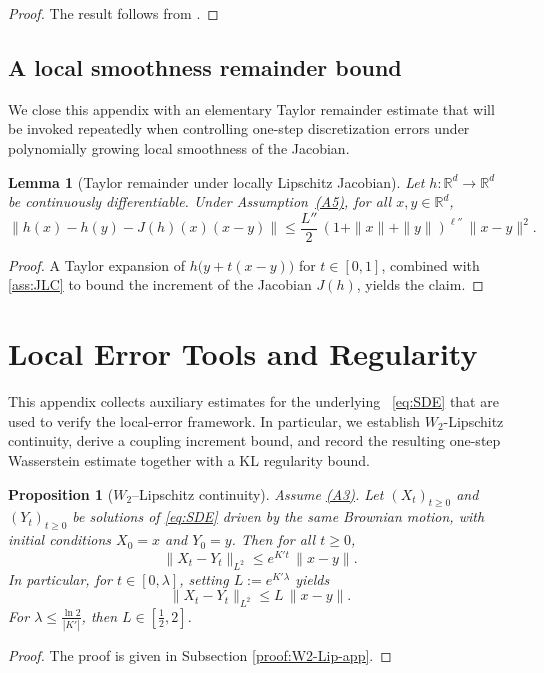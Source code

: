 \documentclass[11pt,a4paper,reqno]{amsart}
\theoremstyle{plain}
\newtheorem{lemma}{Lemma}
\newtheorem{proposition}{Proposition}
\theoremstyle{definition}
\theoremstyle{remark}
\newcommand{\R}{\mathbb{R}}
\begin{document}
\begin{proof}
The result follows from \cite[Lemma 4.2]{lytras2025ktula}.
\end{proof}


\subsection{A local smoothness remainder bound}

We close this appendix with an elementary Taylor remainder estimate that will be invoked
repeatedly when controlling one-step discretization errors under polynomially growing local
smoothness of the Jacobian.

\begin{lemma}[Taylor remainder under locally Lipschitz Jacobian]
\label{lem:local-jacobian}
Let $h:\R^d\to\R^d$ be continuously differentiable.
Under Assumption~\hyperref[ass:JLC]{\textup{(A5)}}, for all $x,y\in\R^d$,
\[
 \big\|h(x)-h(y)-J(h)(x)(x-y)\big\|
 \le \frac{L''}{2}\,(1+\|x\|+\|y\|)^{\ell''}\,\|x-y\|^{2}.
\]
\end{lemma}

\begin{proof}
A Taylor expansion of $h\bigl(y+t(x-y)\bigr)$ for $t\in[0,1]$, combined with \ref{ass:JLC} to bound the increment of the Jacobian $J(h)$, yields the claim.
\end{proof}



\section{Local Error Tools and Regularity}
\label{app:local-error}
This appendix collects auxiliary estimates for the underlying ~\eqref{eq:SDE} that are
used to verify the local-error framework. In particular, we establish
$W_2$-Lipschitz continuity, derive a coupling increment bound, and record the
resulting one-step Wasserstein estimate together with a KL regularity bound.

\begin{proposition}[$W_2$--Lipschitz continuity]
\label{prop:W2-Lip-app}
Assume \hyperref[ass:OSL]{\textup{(A3)}}. Let \((X_t)_{t\ge0}\) and \((Y_t)_{t\ge0}\) be
solutions of \eqref{eq:SDE} driven by the same Brownian motion, with initial conditions
\(X_0=x\) and \(Y_0=y\).
Then for all \(t\ge0\),
\[
  \|X_t-Y_t\|_{L^2}\le e^{K' t}\,\|x-y\|.
\]
In particular, for \(t\in[0,\lambda]\), setting \(L := e^{K'\lambda}\) yields
\[
  \|X_t-Y_t\|_{L^2}\le L\,\|x-y\|.
\]
For \(\lambda\le \frac{\ln 2}{|K'|}\), then \(L\in[\tfrac12,2]\).
\end{proposition}
\begin{proof}
    The proof is given in Subsection \ref{proof:W2-Lip-app}.
\end{proof}
\end{document}
